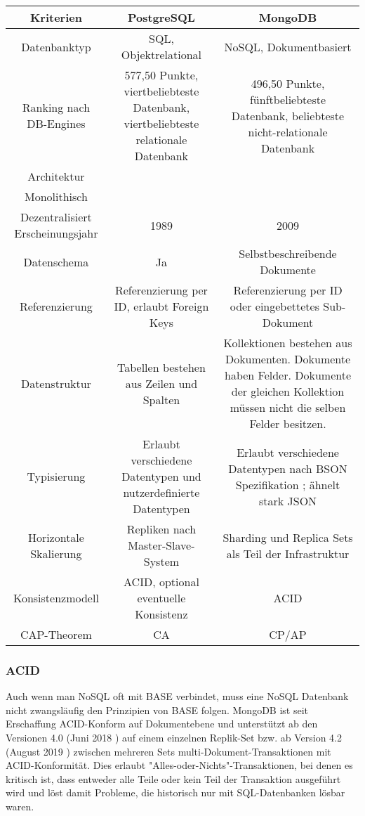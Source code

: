 \begin{center}
    \begin{tabular}{ |c|c|c| } 
     \hline
     Kriterien & PostgreSQL & MongoDB  \\ 
     \hline
     Datenbanktyp & SQL, Objektrelational & NoSQL, Dokumentbasiert \\
     Ranking nach DB-Engines \cite{DB1} & 577,50 Punkte, viertbeliebteste Datenbank, viertbeliebteste relationale Datenbank & 496,50 Punkte, fünftbeliebteste Datenbank, beliebteste nicht-relationale Datenbank \cite{DB2} \\
     Architektur \\ Monolithisch \\ Dezentralisiert
     Erscheinungsjahr & 1989 & 2009 \\
     Datenschema & Ja & Selbstbeschreibende Dokumente\\
     Referenzierung & Referenzierung per ID, erlaubt Foreign Keys & Referenzierung per ID oder eingebettetes Sub-Dokument \\
     Datenstruktur & Tabellen bestehen aus Zeilen und Spalten & Kollektionen bestehen aus Dokumenten. Dokumente haben Felder. Dokumente der gleichen Kollektion müssen nicht die selben Felder besitzen. \\
     Typisierung & Erlaubt verschiedene Datentypen und nutzerdefinierte Datentypen\cite{PG5} & Erlaubt verschiedene Datentypen nach BSON Spezifikation \cite{MG3}; ähnelt stark JSON \\
     Horizontale Skalierung & Repliken nach Master-Slave-System \cite{PG6} & Sharding und Replica Sets als Teil der Infrastruktur \cite{MG4} \cite{MG5} \\
     Konsistenzmodell & ACID, optional eventuelle Konsistenz \cite{MG6} \cite{MG7}  & ACID \\
     CAP-Theorem & CA & CP/AP \\ %
     \hline
    \end{tabular}
    \cite{DB3} \cite{DB4}
\end{center}

\subsubsection{ACID}
Auch wenn man NoSQL oft mit BASE verbindet, muss eine NoSQL Datenbank nicht zwangsläufig den Prinzipien von BASE folgen. MongoDB ist seit Erschaffung ACID-Konform auf Dokumentebene und unterstützt ab den Versionen 4.0 (Juni 2018 \cite{MG8}) auf einem einzelnen Replik-Set bzw. ab Version 4.2 (August 2019 \cite{MG8}) zwischen mehreren Sets multi-Dokument-Transaktionen mit ACID-Konformität. \cite{MG6} Dies erlaubt "Alles-oder-Nichts"-Transaktionen, bei denen es kritisch ist, dass entweder alle Teile oder kein Teil der Transaktion ausgeführt wird und löst damit Probleme, die historisch nur mit SQL-Datenbanken lösbar waren.


